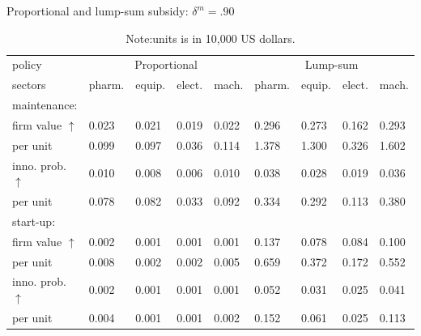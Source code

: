 \documentclass[11pt]{article}
\begin{document}
\clearpage 
\begin{table}[h!]
\caption{Proportional and lump-sum subsidy: $\delta^m=.90$}
\begin{centering}
\small{
\label{TB}
\begin{tabular}{lllllllll}
\toprule
policy              & \multicolumn{4}{c}{Proportional}                     & \multicolumn{4}{c}{Lump-sum}                         \\\cmidrule{2-9}
sectors                      & pharm. & equip. & elect. & mach. & pharm. & equip. & elect. & mach. \\
\hline 
maintenance:           &                &           &             &           &                &           &             &           \\
firm value $\uparrow$        &0.023 & 0.021 & 0.019 & 0.022 & 0.296 & 0.273 & 0.162 & 0.293 \\
per unit                    & 0.099 & 0.097 & 0.036 & 0.114 & 1.378 & 1.300 & 0.326 & 1.602 \\
inno. prob. $\uparrow$    &0.010 & 0.008 & 0.006 & 0.010 & 0.038 & 0.028 & 0.019 & 0.036 \\
per unit                    &0.078 & 0.082 & 0.033 & 0.092 & 0.334 & 0.292 & 0.113 & 0.380 \\
\hline
start-up:               &                &           &             &           &                &           &             &           \\
firm value $\uparrow$       &0.002 & 0.001 & 0.001 & 0.001 & 0.137 & 0.078 & 0.084 & 0.100 \\
per unit                 &0.008 & 0.002 & 0.002 & 0.005 & 0.659 & 0.372 & 0.172 & 0.552 \\
inno. prob. $\uparrow$ &0.002 & 0.001 & 0.001 & 0.001 & 0.052 & 0.031 & 0.025 & 0.041 \\
per unit                 &0.004 & 0.001 & 0.001 & 0.002 & 0.152 & 0.061 & 0.025 & 0.113 \\ \bottomrule
\end{tabular}
}
\end{centering}
\caption*{\footnotesize {}Note:units is in 10,000 US dollars.}{\small \par}
\end{table}
\end{document}
